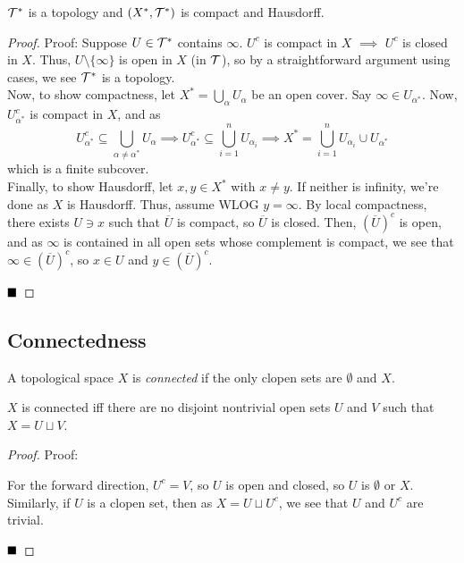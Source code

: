 \begin{lemma}
    $\cal{T}^{*}$ is a topology and $(X^{*}, \cal{T}^{*})$ is compact and Hausdorff.
\end{lemma}
\begin{proof}{Proof:}
    Suppose $U \in \cal{T}^{*}$ contains $\infty$. $U^{c}$ is compact in $X$ $\implies$ $U^{c}$ is closed in $X$. Thus, $U \setminus \{\infty\}$ is open in $X$ (in $\cal{T}$), so by a straightforward argument using cases, we see $\cal{T}^{*}$ is a topology.\\

    Now, to show compactness, let $X^{*} = \bigcup_{\alpha} U_{\alpha}$ be an open cover. Say $\infty \in U_{\alpha^{*}}$. Now, $U_{\alpha^{*}}^{c}$ is compact in $X$, and as
    \[ U_{\alpha^{*}}^{c} \subseteq \bigcup_{\alpha \neq \alpha^{*}} U_{\alpha} \implies U_{\alpha^{*}}^{c} \subseteq \bigcup_{i = 1}^{n} U_{\alpha_i} \implies X^{*} = \bigcup_{i = 1}^{n} U_{\alpha_i} \cup U_{\alpha^{*}} \]
    which is a finite subcover.\\

    Finally, to show Hausdorff, let $x, y \in X^{*}$ with $x \neq y$. If neither is infinity, we're done as $X$ is Hausdorff. Thus, assume WLOG $y = \infty$. By local compactness, there exists $U \ni x$ such that $\overline{U}$ is compact, so $\overline{U}$ is closed. Then, $(\overline{U})^{c}$ is open, and as $\infty$ is contained in all open sets whose complement is compact, we see that $\infty \in (\overline{U})^{c}$, so $x \in U$ and $y \in (\overline{U})^{c}$.

    $\qed$
\end{proof}

\subsection*{Connectedness}
\sectionspace

\begin{definition}
    A topological space $X$ is \emph{connected} if the only clopen sets are $\emptyset$ and $X$.
\end{definition}

\begin{lemma}
    $X$ is connected iff there are no disjoint nontrivial open sets $U$ and $V$ such that $X = U \sqcup V$.
\end{lemma}
\begin{proof}{Proof:}
   
    For the forward direction, $U^{c} = V$, so $U$ is open and closed, so $U$ is $\emptyset$ or $X$. Similarly, if $U$ is a clopen set, then as $X = U \sqcup U^{c}$, we see that $U$ and $U^{c}$ are trivial. 

    $\qed$
\end{proof}

